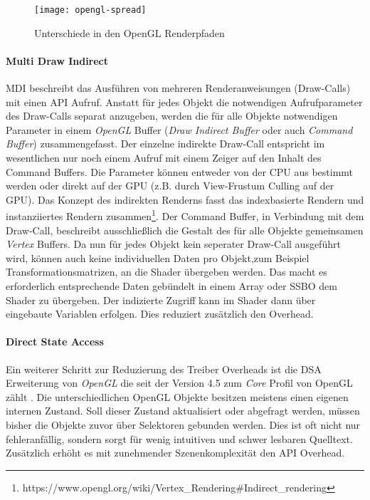 \begin{figure}
	\texttt{[image: opengl-spread]}
	\caption[Unterschiede in den OpenGL Renderpfaden]{Unterschiede in den OpenGL Renderpfaden \parencite[Seite 98]{Everitt2014}}
	\label{fig:opengl-pfade}
\end{figure}

\paragraph{Multi Draw Indirect} 
\ac{MDI} beschreibt das Ausführen von mehreren Renderanweisungen (Draw-Calls) mit einen \ac{API} Aufruf. Anstatt für jedes Objekt die notwendigen Aufrufparameter des Draw-Calls separat anzugeben, werden die für alle Objekte notwendigen Parameter in einem \textit{OpenGL} Buffer (\textit{Draw Indirect Buffer} oder auch \textit{Command Buffer}) zusammengefasst. Der einzelne indirekte Draw-Call entspricht im wesentlichen nur noch einem Aufruf mit einem Zeiger auf den Inhalt des Command Buffers. Die Parameter können entweder von der CPU aus bestimmt werden oder direkt auf der GPU (z.B. durch View-Frustum Culling auf der GPU). Das Konzept des indirekten Renderns fasst das indexbasierte Rendern und instanziiertes Rendern zusammen\footnote{https://www.opengl.org/wiki/Vertex\_Rendering\#Indirect\_rendering}. Der Command Buffer, in Verbindung mit dem Draw-Call, beschreibt ausschließlich die Gestalt des für alle Objekte gemeinsamen \textit{Vertex} Buffers. Da nun für jedes Objekt kein seperater Draw-Call ausgeführt wird, können auch keine individuellen Daten pro Objekt,zum Beispiel Transformationsmatrizen, an die Shader übergeben werden. Das macht es erforderlich entsprechende Daten gebündelt in einem Array oder \ac{SSBO} dem Shader zu übergeben. Der indizierte Zugriff kann im Shader dann über eingebaute Variablen erfolgen. Dies reduziert zusätzlich den Overhead.

\paragraph{Direct State Access} Ein weiterer Schritt zur Reduzierung des Treiber Overheads ist die \ac{DSA} Erweiterung von \textit{OpenGL} die seit der Version 4.5 zum \textit{Core} Profil von OpenGL zählt \parencite{Akeley2015}. Die unterschiedlichen OpenGL Objekte besitzen meistens einen eigenen internen Zustand. Soll dieser Zustand aktualisiert oder abgefragt werden, müssen bisher die Objekte zuvor über Selektoren gebunden werden. Dies ist oft nicht nur fehleranfällig, sondern sorgt für wenig intuitiven und schwer lesbaren Quelltext. Zusätzlich erhöht es mit zunehmender Szenenkomplexität den \ac{API} Overhead.

